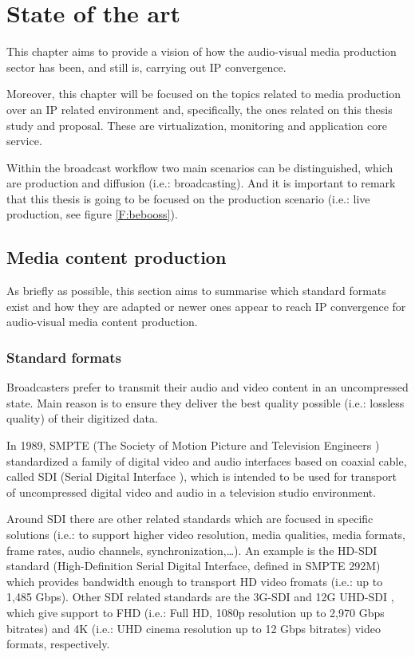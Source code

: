 \chapter{State of the art}\label{A:stateOfTheArt}

This chapter aims to provide a vision of how the audio-visual media production sector has been, and still is, carrying out IP convergence. 

Moreover, this chapter will be focused on the topics related to media production over an IP related environment and, specifically, the ones related on this thesis study and proposal. These are virtualization, monitoring and application core service.

Within the broadcast workflow two main scenarios can be distinguished, which are production and diffusion (i.e.: broadcasting). And it is important to remark that this thesis is going to be focused on the production scenario (i.e.: live production, see figure \ref{F:bebooss}).

\section{Media content production}

As briefly as possible, this section aims to summarise which standard formats exist and how they are adapted or newer ones appear to reach IP convergence for audio-visual media content production.

\subsection{Standard formats}

Broadcasters prefer to transmit their audio and video content in an uncompressed state. Main reason is to ensure they deliver the best quality possible (i.e.: lossless quality) of their digitized data. 

In 1989, SMPTE (The Society of Motion Picture and Television Engineers \cite{smpte}) standardized a family of digital video and audio interfaces based on coaxial cable, called SDI (Serial Digital Interface \cite{SDI}), which is intended to be used for transport of uncompressed digital video and audio in a television studio environment. 

Around SDI there are other related standards which are focused in specific solutions (i.e.: to support higher video resolution, media qualities, media formats, frame rates, audio channels, synchronization,\ldots). An example is the HD-SDI \cite{SDI} standard (High-Definition Serial Digital Interface, defined in SMPTE 292M) which provides bandwidth enough to transport HD video fromats (i.e.: up to 1,485 Gbps). Other SDI related standards are the 3G-SDI \cite{3GSDI} and 12G UHD-SDI \cite{UHDSDI}, which give support to FHD (i.e.: Full HD, 1080p resolution up to 2,970 Gbps bitrates) and 4K (i.e.: UHD cinema resolution up to 12 Gbps bitrates) video formats, respectively. 

